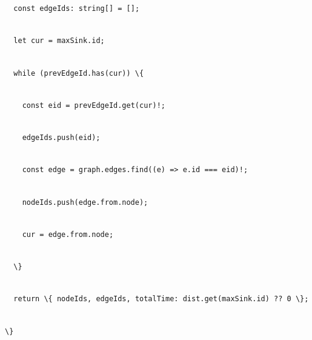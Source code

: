\documentclass[
]{article}
\newcommand{\passthrough}[1]{#1}
\begin{document}
\passthrough{\lstinline!  !}\passthrough{\lstinline!const!}\passthrough{\lstinline! !}\passthrough{\lstinline!edgeIds!}\passthrough{\lstinline!:!}\passthrough{\lstinline! !}\passthrough{\lstinline!string[]!}\passthrough{\lstinline! !}\passthrough{\lstinline!=!}\passthrough{\lstinline! !}\passthrough{\lstinline![];!}\strut \\
\passthrough{\lstinline!  !}\passthrough{\lstinline!let!}\passthrough{\lstinline! !}\passthrough{\lstinline!cur!}\passthrough{\lstinline! !}\passthrough{\lstinline!=!}\passthrough{\lstinline! !}\passthrough{\lstinline!maxSink.id;!}\strut \\
\passthrough{\lstinline!  !}\passthrough{\lstinline!while!}\passthrough{\lstinline! !}\passthrough{\lstinline!(!}\passthrough{\lstinline!prevEdgeId.has!}\passthrough{\lstinline!(cur))!}\passthrough{\lstinline! !}\passthrough{\lstinline!\{!}\strut \\
\passthrough{\lstinline!    !}\passthrough{\lstinline!const!}\passthrough{\lstinline! !}\passthrough{\lstinline!eid!}\passthrough{\lstinline! !}\passthrough{\lstinline!=!}\passthrough{\lstinline! !}\passthrough{\lstinline!prevEdgeId.get!}\passthrough{\lstinline"(cur)!;"}\strut \\
\passthrough{\lstinline!    !}\passthrough{\lstinline!edgeIds.push!}\passthrough{\lstinline!(!}\passthrough{\lstinline!eid!}\passthrough{\lstinline!);!}\strut \\
\passthrough{\lstinline!    !}\passthrough{\lstinline!const!}\passthrough{\lstinline! !}\passthrough{\lstinline!edge!}\passthrough{\lstinline! !}\passthrough{\lstinline!=!}\passthrough{\lstinline! !}\passthrough{\lstinline!graph.edges.find!}\passthrough{\lstinline!((e)!}\passthrough{\lstinline! !}\passthrough{\lstinline!=>!}\passthrough{\lstinline! !}\passthrough{\lstinline!e.id!}\passthrough{\lstinline! !}\passthrough{\lstinline!===!}\passthrough{\lstinline! !}\passthrough{\lstinline!eid!}\passthrough{\lstinline")!;"}\strut \\
\passthrough{\lstinline!    !}\passthrough{\lstinline!nodeIds.push!}\passthrough{\lstinline!(!}\passthrough{\lstinline!edge.from.node!}\passthrough{\lstinline!);!}\strut \\
\passthrough{\lstinline!    !}\passthrough{\lstinline!cur!}\passthrough{\lstinline! !}\passthrough{\lstinline!=!}\passthrough{\lstinline! !}\passthrough{\lstinline!edge.from.node!}\passthrough{\lstinline!;!}\strut \\
\passthrough{\lstinline!  !}\passthrough{\lstinline!\}!}\strut \\
\passthrough{\lstinline!  !}\passthrough{\lstinline!return!}\passthrough{\lstinline! !}\passthrough{\lstinline!\{!}\passthrough{\lstinline! !}\passthrough{\lstinline!nodeIds!}\passthrough{\lstinline!,!}\passthrough{\lstinline! !}\passthrough{\lstinline!edgeIds!}\passthrough{\lstinline!,!}\passthrough{\lstinline! !}\passthrough{\lstinline!totalTime!}\passthrough{\lstinline!:!}\passthrough{\lstinline! !}\passthrough{\lstinline!dist.get!}\passthrough{\lstinline!(maxSink.id)!}\passthrough{\lstinline! !}\passthrough{\lstinline!??!}\passthrough{\lstinline! !}\passthrough{\lstinline!0!}\passthrough{\lstinline! !}\passthrough{\lstinline!\};!}\strut \\
\passthrough{\lstinline!\}!}
\end{document}
